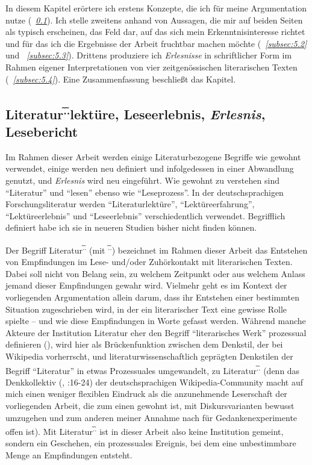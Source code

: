 \documentclass[fontsize=12pt]{scrartcl}
\begin{document}
In diesem Kapitel er\"ortere ich erstens Konzepte, die ich f\"ur meine Argumentation nutze (\textit{~\ref{subsec:5.1}}). Ich stelle zwei\-tens anhand von Aussagen, die mir auf beiden Sei\-ten als ty\-pisch erscheinen, das Feld dar, auf das sich mein Erkenntnisinteresse richtet und f\"ur das ich die Ergebnisse der Arbeit fruchtbar machen m\"ochte (\textit{~\ref{subsec:5.2}} und \textit{~\ref{subsec:5.3}}). Drittens produziere ich \textit{Erlesnisse} in schriftlicher Form im Rahmen eigener Interpretationen von \mbox{vier} zeitgen\"ossischen li\-te\-ra\-rischen Texten (\textit{~\ref{subsec:5.4}}). Eine Zusammenfassung beschlie{\ss}t das Kapitel.

\subsection{Literatur\textsuperscript{\~.\~.}lekt\"ure, Leseerlebnis, \textit{Erlesnis}, Lesebericht}
\label{subsec:5.1}

Im Rahmen dieser Arbeit werden einige Li\-te\-ra\-tur\-bezogene Begriffe wie gewohnt verwendet, einige werden neu definiert und infolgedessen in einer Abwandlung genutzt, und \textit{Erlesnis} wird neu eingef\"uhrt. Wie gewohnt zu verstehen sind "`Li\-te\-ra\-tur"' und "`lesen"' ebenso wie "`Leseprozess"'. In der deutschspra\-chi\-gen For\-schungs\-li\-te\-ra\-tur werden "`Li\-te\-ra\-tur\-lekt\"ure"', "`Lekt\"ureerfah\-rung"', "`Lekt\"ureerlebnis"' und "`Leseerlebnis"' verschiedentlich verwendet. Begrifflich definiert habe ich sie in neueren Studien bis\-her nicht finden k\"onnen.

Der Begriff Li\-te\-ra\-tur\textsuperscript{\~.\~.} (mit \textsuperscript{\~.\~.}) be\-zeichnet im Rahmen dieser Arbeit das Entstehen von Emp\-fin\-dun\-gen im Lese- und/oder Zuh\"orkontakt mit li\-te\-ra\-rischen Texten. Dabei soll nicht von Belang sein, zu welchem Zeitpunkt oder aus welchem Anlass jemand dieser Emp\-fin\-dun\-gen gewahr wird. Vielmehr geht es im Kontext der vorliegenden Argumentation allein darum, dass ihr Entstehen einer bestimmten Situation zugeschrieben wird, in der ein li\-te\-ra\-rischer Text eine gewisse Rolle spielte -- und wie diese Empfin\-dungen in Worte gefasst werden. W\"ahrend manche Akteure\textsuperscript{\tiny *} der Institution Li\-te\-ra\-tur eher den Begriff "`li\-te\-ra\-risches Werk"' prozessual definieren (\cite{Attridge2004}), wird \mbox{hier} als Br\"uckenfunktion zwischen dem Denkstil, der bei Wi\-ki\-pe\-dia vor\-herrscht, und li\-te\-ra\-tur\-wissenschaftlich gepr\"agten Denkstilen der Begriff "`Li\-te\-ra\-tur"' in etwas Pro\-zessu\-ales umgewandelt, zu Li\-te\-ra\-tur\textsuperscript{\~.\~.} (denn das Denkkollektiv (\cite{Moller2007}, \cite{WernerZittel2011}:16-24) der deutschspra\-chi\-gen Wi\-ki\-pe\-dia-Community macht auf mich ei\-nen we\-ni\-ger flexiblen Eindruck als die anzunehmende Leser\textsuperscript{\tiny *}schaft der vorliegenden Arbeit, die zum einen gewohnt ist, mit Diskursvarianten bewusst umzugehen und zum anderen mei\-ner Annahme nach f\"ur Gedankenexperimente offen ist). Mit Li\-te\-ra\-tur\textsuperscript{\~.\~.} ist in dieser Arbeit also keine Institution gemeint, sondern ein Geschehen, ein prozessuales Ereignis, bei dem eine unbestimmbare Menge an Emp\-fin\-dun\-gen entsteht.
\end{document}
